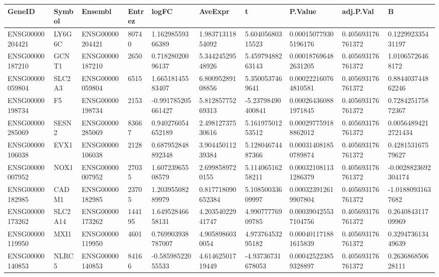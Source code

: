 \begingroup
\tiny
\setlength{\tabcolsep}{2pt}
\renewcommand{\arraystretch}{1.18}
\begin{tabular}{@{}llllllllll@{}}
\toprule
GeneID & Symbol & Ensembl & Entrez & logFC & AveExpr & t & P.Value & adj.P.Val & B \\
\midrule
ENSG00000204421 & LY6G6C & ENSG00000204421 & 80740 & 1.16298559366389 & 1.98371311854092 & 5.60405680315523 & 0.000150779305196176 & 0.405693176761372 & 0.122992335431197 \\
ENSG00000187210 & GCNT1 & ENSG00000187210 & 2650 & 0.71828020096137 & 5.34424529548926 & 5.45979488263143 & 0.000187696482631205 & 0.405693176761372 & 1.01065726468172 \\
ENSG00000059804 & SLC2A3 & ENSG00000059804 & 6515 & 1.66518145583407 & 6.80095289108856 & 5.3500537469641 & 0.000222160764810581 & 0.405693176761372 & 0.884403744862246 \\
ENSG00000198734 & F5 & ENSG00000198734 & 2153 & -0.991785205661427 & 5.81285775269313 & -5.23798490400841 & 0.000264360881971845 & 0.405693176761372 & 0.728425175872367 \\
ENSG00000285069 & SESN2 & ENSG00000285069 & 83667 & 0.940276054652189 & 2.49812737530616 & 5.16197501253512 & 0.000297759188862012 & 0.405693176761372 & 0.00564894212721434 \\
ENSG00000106038 & EVX1 & ENSG00000106038 & 2128 & 0.687952848892348 & 3.90445011239384 & 5.12804674487366 & 0.000314081850789874 & 0.405693176761372 & 0.428153167579627 \\
ENSG00000007952 & NOX1 & ENSG00000007952 & 27035 & 1.60723965508579 & 2.6998589720155 & 5.11406516258211 & 0.000321081131286379 & 0.405693176761372 & -0.0028823692304174 \\
ENSG00000182985 & CADM1 & ENSG00000182985 & 23705 & 1.20395508289979 & 0.817718090652384 & 5.10850033609997 & 0.000323912619907804 & 0.405693176761372 & -1.01880931637682 \\
ENSG00000173262 & SLC2A14 & ENSG00000173262 & 144195 & 1.64952846658131 & 4.20354022941747 & 4.99077776909785 & 0.000390425537104756 & 0.405693176761372 & 0.264084311709969 \\
ENSG00000119950 & MXI1 & ENSG00000119950 & 4601 & 0.769903938787007 & 4.9058986030054 & 4.97376453295182 & 0.000401171881615839 & 0.405693176761372 & 0.329473613449639 \\
ENSG00000140853 & NLRC5 & ENSG00000140853 & 84166 & -0.58598522055533 & 4.61462501719449 & -4.93736731678053 & 0.000425223859328897 & 0.405693176761372 & 0.263686850628111 \\

\end{tabular}
